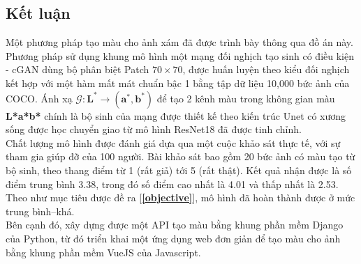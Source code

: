 \documentclass[a4paper, 12pt]{article}
\begin{document}
\subsection{Kết luận}
Một phương pháp tạo màu cho ảnh xám đã được trình bày thông qua đồ án này. Phương pháp sử dụng khung mô hình một mạng đối nghịch tạo sinh có điều kiện - cGAN dùng bộ phân biệt Patch $70\times 70$, được huấn luyện theo kiểu đối nghịch kết hợp với một hàm mất mát chuẩn bậc 1 bằng tập dữ liệu 10,000 bức ảnh của COCO. Ánh xạ $\mathcal{G}:\mathbf{L^*} \rightarrow (\mathbf{a^*}, \mathbf{b^*})$ để tạo 2 kênh màu trong không gian màu \textbf{L*a*b*} chính là bộ sinh của mạng được thiết kế theo kiến trúc Unet có xương sống được học chuyển giao từ mô hình ResNet18 đã được tinh chỉnh.\vspace{5pt}\\
Chất lượng mô hình được đánh giá dựa qua một cuộc khảo sát thực tế, với sự tham gia giúp đỡ của 100 người. Bài khảo sát bao gồm 20 bức ảnh có màu tạo từ bộ sinh, theo thang điểm từ 1 (rất giả) tới 5 (rất thật). Kết quả nhận được là số điểm trung bình 3.38, trong đó số điểm cao nhất là 4.01 và thấp nhất là 2.53. Theo như mục tiêu được đề ra [\textbf{\ref{objective}}], mô hình đã hoàn thành được ở mức trung bình--khá.\vspace{5pt}\\
Bên cạnh đó, xây dựng được một API tạo màu bằng khung phần mềm Django của Python, từ đó triển khai một ứng dụng web đơn giản để tạo màu cho ảnh bằng khung phần mềm VueJS của Javascript.
\end{document}
